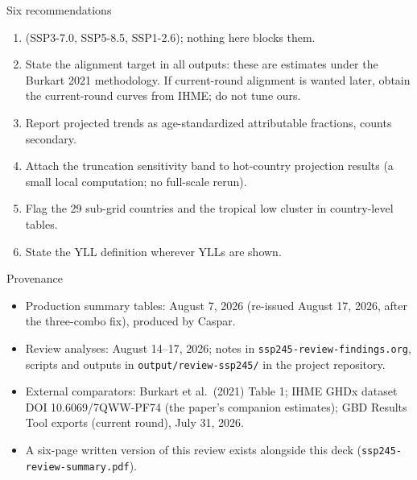 \documentclass[aspectratio=169,11pt]{beamer}
\begin{document}
\begin{frame}{Six recommendations}
  \begin{enumerate}
    \item {}
      (SSP3-7.0, SSP5-8.5, SSP1-2.6); nothing here blocks them.
    \item State the alignment target in all outputs: these are estimates
      under the Burkart 2021 methodology. If current-round alignment is
      wanted later, obtain the current-round curves from IHME; do not tune
      ours.
    \item Report projected trends as age-standardized attributable
      fractions, counts secondary.
    \item Attach the truncation sensitivity band to hot-country projection
      results (a small local computation; no full-scale rerun).
    \item Flag the 29 sub-grid countries and the tropical low cluster in
      country-level tables.
    \item State the YLL definition wherever YLLs are shown.
  \end{enumerate}
\end{frame}

\begin{frame}{Provenance}
  \begin{itemize}
    \item Production summary tables: August 7, 2026 (re-issued August 17,
      2026, after the three-combo fix), produced by Caspar.
    \item Review analyses: August 14--17, 2026; notes in
      \texttt{ssp245-review-findings.org}, scripts and outputs in
      \texttt{output/review-ssp245/} in the project repository.
    \item External comparators: Burkart et al.\ (2021) Table 1; IHME GHDx
      dataset DOI 10.6069/7QWW-PF74 (the paper's companion estimates); GBD
      Results Tool exports (current round), July 31, 2026.
    \item A six-page written version of this review exists alongside this
      deck (\texttt{ssp245-review-summary.pdf}).
  \end{itemize}
\end{frame}
\end{document}
